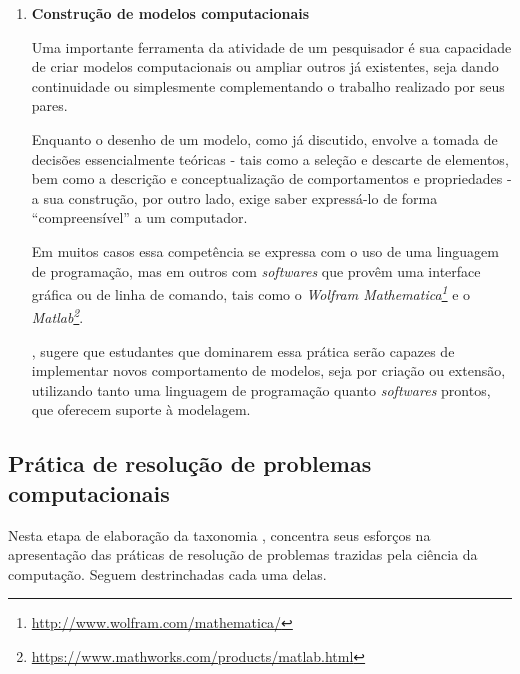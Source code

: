 \begin{enumerate}
  \item \textbf{Construção de modelos computacionais}

  Uma importante ferramenta da atividade de um pesquisador é sua capacidade de criar modelos computacionais ou ampliar outros já existentes, seja dando continuidade ou simplesmente complementando o trabalho realizado por seus pares. 

  Enquanto o desenho de um modelo, como já discutido, envolve a tomada de decisões essencialmente teóricas - tais como a seleção e descarte de elementos, bem como a descrição e conceptualização de comportamentos e propriedades - a sua construção, por outro lado, exige saber expressá-lo de forma ``compreensível'' a um computador. 
  
  Em muitos casos essa competência se expressa com o uso de uma linguagem de programação, mas em outros com \textit{softwares} que provêm uma interface gráfica ou de linha de comando, tais como o \textit{Wolfram Mathematica\footnote{\href{http://www.wolfram.com/mathematica/}{http://www.wolfram.com/mathematica/} }} e o \textit{Matlab\footnote{\href{https://www.mathworks.com/products/matlab.html}{https://www.mathworks.com/products/matlab.html}}}.

  , sugere que estudantes que dominarem essa prática serão capazes de implementar novos comportamento de modelos, seja por criação ou extensão, utilizando tanto uma linguagem de programação quanto \textit{softwares} prontos, que oferecem suporte à modelagem.
\end{enumerate}

\subsection{Prática de resolução de problemas computacionais}\label{sub-sec:pratica-de-resolucao-de-problemas-computacionais} 

Nesta etapa de elaboração da taxonomia , concentra seus esforços na apresentação das práticas de resolução de problemas trazidas pela ciência da computação. Seguem destrinchadas cada uma delas. 

